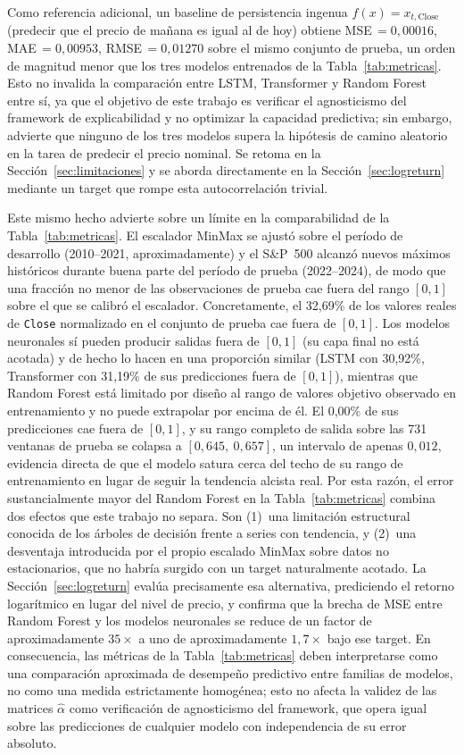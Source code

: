 \documentclass[conference, letterpaper]{IEEEtran}
\begin{document}
Como referencia adicional, un baseline de persistencia ingenua
$f(x) = x_{t,\text{Close}}$ (predecir que el precio de mañana es
igual al de hoy) obtiene MSE\,$=0{,}00016$, MAE\,$=0{,}00953$,
RMSE\,$=0{,}01270$ sobre el mismo conjunto de prueba, un orden de
magnitud menor que los tres modelos entrenados de la
Tabla~\ref{tab:metricas}. Esto no invalida la comparación entre
LSTM, Transformer y Random Forest entre sí, ya que el objetivo de
este trabajo es verificar el agnosticismo del framework de
explicabilidad y no optimizar la capacidad predictiva; sin embargo,
advierte que ninguno de los tres modelos supera la hipótesis de
camino aleatorio en la tarea de predecir el precio nominal. Se
retoma en la Sección~\ref{sec:limitaciones} y se aborda directamente
en la Sección~\ref{sec:logreturn} mediante un target que rompe esta
autocorrelación trivial.

Este mismo hecho advierte sobre un límite en la comparabilidad de
la Tabla~\ref{tab:metricas}. El escalador MinMax se ajustó sobre el
período de desarrollo (2010--2021, aproximadamente) y el S\&P~500
alcanzó nuevos máximos históricos durante buena parte del período de
prueba (2022--2024), de modo que una fracción no menor de las
observaciones de prueba cae fuera del rango $[0,1]$ sobre el que se
calibró el escalador. Concretamente, el 32{,}69\% de los valores
reales de \texttt{Close} normalizado en el conjunto de prueba cae
fuera de $[0,1]$. Los modelos neuronales sí pueden producir salidas
fuera de $[0,1]$ (su capa final no está acotada) y de hecho lo hacen
en una proporción similar (LSTM con 30{,}92\%, Transformer con 31{,}19\%
de sus predicciones fuera de $[0,1]$), mientras que Random Forest
está limitado por diseño al rango de valores objetivo observado en
entrenamiento y no puede extrapolar por encima de él. El 0{,}00\% de
sus predicciones cae fuera de $[0,1]$, y su rango completo de salida
sobre las 731 ventanas de prueba se colapsa a
$[0{,}645,\ 0{,}657]$, un intervalo de apenas $0{,}012$, evidencia
directa de que el modelo satura cerca del techo de su rango de
entrenamiento en lugar de seguir la tendencia alcista real. Por esta
razón, el error sustancialmente mayor del
Random Forest en la Tabla~\ref{tab:metricas} combina dos efectos que
este trabajo no separa. Son (1)~una limitación estructural conocida de
los árboles de decisión frente a series con tendencia, y (2)~una
desventaja introducida por el propio escalado MinMax sobre datos no
estacionarios, que no habría surgido con un target naturalmente
acotado. La Sección~\ref{sec:logreturn} evalúa precisamente esa
alternativa, prediciendo el retorno logarítmico en lugar del nivel
de precio, y confirma que la brecha de MSE entre Random Forest y los
modelos neuronales se reduce de un factor de aproximadamente
$35{\times}$ a uno de aproximadamente $1{,}7{\times}$ bajo ese
target. En consecuencia, las métricas de la
Tabla~\ref{tab:metricas} deben interpretarse como una comparación
aproximada de desempeño predictivo entre familias de modelos, no
como una medida estrictamente homogénea; esto no afecta la validez
de las matrices $\hat{\alpha}$ como verificación de agnosticismo del
framework, que opera igual sobre las predicciones de cualquier
modelo con independencia de su error absoluto.
\end{document}
